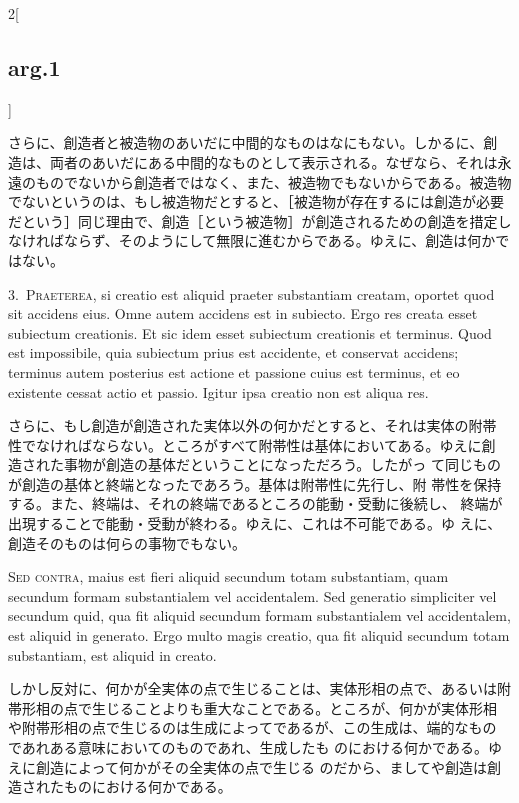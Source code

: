 \documentclass[paper=a4paper,fontsize=10pt,jafontsize=9pt,titlepage]{jlreq}
\begin{document}
\begin{paracol}{2}[\subsection{arg.1}]
\switchcolumn

さらに、創造者と被造物のあいだに中間的なものはなにもない。しかるに、創
造は、両者のあいだにある中間的なものとして表示される。なぜなら、それは永
遠のものでないから創造者ではなく、また、被造物でもないからである。被造物
でないというのは、もし被造物だとすると、［被造物が存在するには創造が必要
だという］同じ理由で、創造［という被造物］が創造されるための創造を措定し
なければならず、そのようにして無限に進むからである。ゆえに、創造は何かで
はない。


3.~{\scshape Praeterea}, si creatio est aliquid praeter substantiam creatam, oportet
 quod sit accidens eius. Omne autem accidens est in subiecto. Ergo res
 creata esset subiectum creationis. Et sic idem esset subiectum
 creationis et terminus. Quod est impossibile, quia subiectum prius est
 accidente, et conservat accidens; terminus autem posterius est actione
 et passione cuius est terminus, et eo existente cessat actio et
 passio. Igitur ipsa creatio non est aliqua res.

\switchcolumn

さらに、もし創造が創造された実体以外の何かだとすると、それは実体の附帯
 性でなければならない。ところがすべて附帯性は基体においてある。ゆえに創
 造された事物が創造の基体だということになっただろう。したがっ
 て同じものが創造の基体と終端となったであろう。基体は附帯性に先行し、附
 帯性を保持する。また、終端は、それの終端であるところの能動・受動に後続し、
 終端が出現することで能動・受動が終わる。ゆえに、これは不可能である。ゆ
 えに、創造そのものは何らの事物でもない。

\switchcolumn*[\subsection{s.c.}]

{\scshape Sed contra}, maius est fieri aliquid secundum totam substantiam, quam
 secundum formam substantialem vel accidentalem. Sed generatio
 simpliciter vel secundum quid, qua fit aliquid secundum formam
 substantialem vel accidentalem, est aliquid in generato. Ergo multo
 magis creatio, qua fit aliquid secundum totam substantiam, est aliquid
 in creato.

\switchcolumn

しかし反対に、何かが全実体の点で生じることは、実体形相の点で、あるいは附
 帯形相の点で生じることよりも重大なことである。ところが、何かが実体形相
 や附帯形相の点で生じるのは生成によってであるが、この生成は、端的なもの
 であれある意味においてのものであれ、生成したも
 のにおける何かである。ゆえに創造によって何かがその全実体の点で生じる
 のだから、ましてや創造は創造されたものにおける何かである。


\end{paracol}
\end{document}

